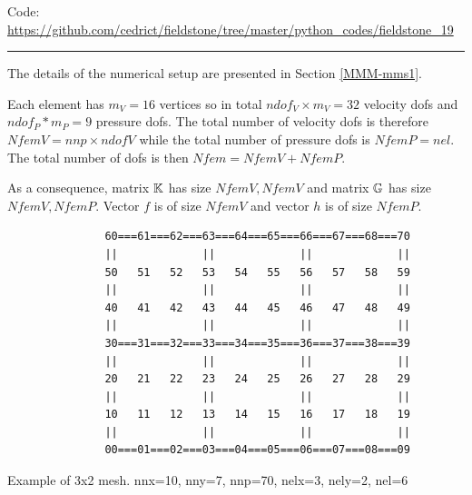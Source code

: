 

\begin{center}
\inpython
{\small Code: \url{https://github.com/cedrict/fieldstone/tree/master/python_codes/fieldstone_19}}
\end{center}

\par\noindent\rule{\textwidth}{0.4pt}


The details of the numerical setup are presented in Section \ref{MMM-mms1}.

Each element has $m_V=16$ vertices so in total $ndof_V\times m_V=32$ 
velocity dofs and 
$ndof_P*m_P=9$ pressure dofs. The total number of 
velocity dofs is therefore $NfemV=nnp \times ndofV$ while the total number of
pressure dofs is $NfemP=nel$. The total number of dofs is then $Nfem=NfemV+NfemP$.

As a consequence, matrix ${\mathbb{K}}$ has size $NfemV,NfemV$ and matrix ${\mathbb{G}}$ has size $NfemV,NfemP$.
Vector $f$ is of size $NfemV$ and vector $h$ is of size $NfemP$.  

\begin{center}
\begin{verbatim}
               60===61===62===63===64===65===66===67===68===70
               ||             ||             ||             ||
               50   51   52   53   54   55   56   57   58   59
               ||             ||             ||             ||
               40   41   42   43   44   45   46   47   48   49
               ||             ||             ||             ||
               30===31===32===33===34===35===36===37===38===39
               ||             ||             ||             ||
               20   21   22   23   24   25   26   27   28   29
               ||             ||             ||             ||
               10   11   12   13   14   15   16   17   18   19
               ||             ||             ||             ||
               00===01===02===03===04===05===06===07===08===09
\end{verbatim}
{\captionfont Example of 3x2 mesh. nnx=10, nny=7, nnp=70, nelx=3, nely=2, nel=6}
\end{center}


